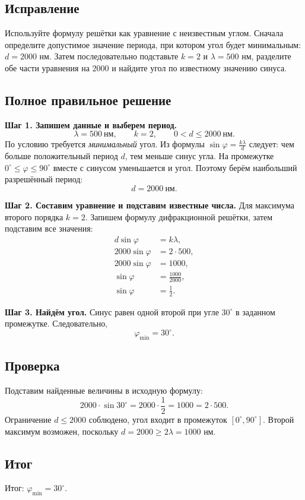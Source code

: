 \documentclass[12pt,a4paper]{article}
\begin{document}
\subsection*{Исправление}
Используйте формулу решётки как уравнение с неизвестным углом. Сначала определите допустимое значение периода, при котором угол будет минимальным: $d=2000$ нм. Затем последовательно подставьте $k=2$ и $\lambda=500$ нм, разделите обе части уравнения на $2000$ и найдите угол по известному значению синуса.

\subsection*{Полное правильное решение}
\textbf{Шаг 1. Запишем данные и выберем период.}
\[
\lambda=500\ \text{нм},\qquad k=2,\qquad 0<d\le2000\ \text{нм}.
\]
По условию требуется \emph{минимальный} угол. Из формулы $\sin\varphi=\frac{k\lambda}{d}$ следует: чем больше положительный период $d$, тем меньше синус угла. На промежутке $0^\circ\le\varphi\le90^\circ$ вместе с синусом уменьшается и угол. Поэтому берём наибольший разрешённый период:
\[
d=2000\ \text{нм}.
\]

\textbf{Шаг 2. Составим уравнение и подставим известные числа.}
Для максимума второго порядка $k=2$. Запишем формулу дифракционной решётки, затем подставим все значения:
\begin{align*}
d\sin\varphi&=k\lambda,\\
2000\sin\varphi&=2\cdot500,\\
2000\sin\varphi&=1000,\\
\sin\varphi&=\frac{1000}{2000},\\
\sin\varphi&=\frac12.
\end{align*}

\textbf{Шаг 3. Найдём угол.}
Синус равен одной второй при угле $30^\circ$ в заданном промежутке. Следовательно,
\[
\varphi_{\min}=30^\circ.
\]

\subsection*{Проверка}
Подставим найденные величины в исходную формулу:
\[
2000\cdot\sin30^\circ=2000\cdot\frac12=1000=2\cdot500.
\]
Ограничение $d\le2000$ соблюдено, угол входит в промежуток $[0^\circ,90^\circ]$. Второй максимум возможен, поскольку $d=2000\ge2\lambda=1000$ нм.

\subsection*{Итог}
\textcolor{teal!60!black}{Итог:} $\boxed{\varphi_{\min}=30^\circ}$.
\end{document}
